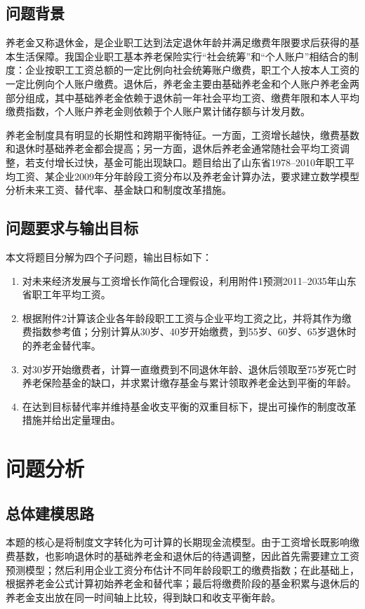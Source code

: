 \documentclass[UTF8,12pt,a4paper]{ctexart}
\begin{document}
\subsection{问题背景}
养老金又称退休金，是企业职工达到法定退休年龄并满足缴费年限要求后获得的基本生活保障。我国企业职工基本养老保险实行“社会统筹”和“个人账户”相结合的制度：企业按职工工资总额的一定比例向社会统筹账户缴费，职工个人按本人工资的一定比例向个人账户缴费。退休后，养老金主要由基础养老金和个人账户养老金两部分组成，其中基础养老金依赖于退休前一年社会平均工资、缴费年限和本人平均缴费指数，个人账户养老金则依赖于个人账户累计储存额与计发月数。

养老金制度具有明显的长期性和跨期平衡特征。一方面，工资增长越快，缴费基数和退休时基础养老金都会提高；另一方面，退休后养老金通常随社会平均工资调整，若支付增长过快，基金可能出现缺口。题目给出了山东省1978--2010年职工平均工资、某企业2009年分年龄段工资分布以及养老金计算办法，要求建立数学模型分析未来工资、替代率、基金缺口和制度改革措施。

\subsection{问题要求与输出目标}
本文将题目分解为四个子问题，输出目标如下：
\begin{enumerate}[label=\textbf{问题\arabic*：}]
\item 对未来经济发展与工资增长作简化合理假设，利用附件1预测2011--2035年山东省职工年平均工资。
\item 根据附件2计算该企业各年龄段职工工资与企业平均工资之比，并将其作为缴费指数参考值；分别计算从30岁、40岁开始缴费，到55岁、60岁、65岁退休时的养老金替代率。
\item 对30岁开始缴费者，计算一直缴费到不同退休年龄、退休后领取至75岁死亡时养老保险基金的缺口，并求累计缴存基金与累计领取养老金达到平衡的年龄。
\item 在达到目标替代率并维持基金收支平衡的双重目标下，提出可操作的制度改革措施并给出定量理由。
\end{enumerate}

\section{问题分析}
\subsection{总体建模思路}
本题的核心是将制度文字转化为可计算的长期现金流模型。由于工资增长既影响缴费基数，也影响退休时的基础养老金和退休后的待遇调整，因此首先需要建立工资预测模型；然后利用企业工资分布估计不同年龄段职工的缴费指数；在此基础上，根据养老金公式计算初始养老金和替代率；最后将缴费阶段的基金积累与退休后的养老金支出放在同一时间轴上比较，得到缺口和收支平衡年龄。
\end{document}
